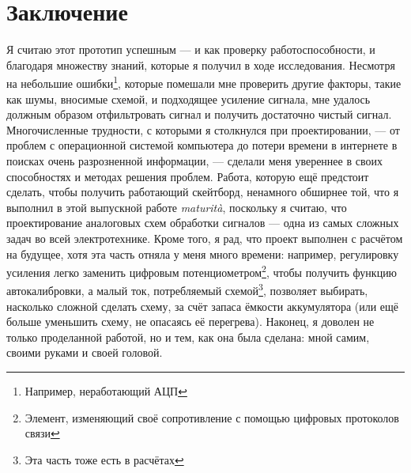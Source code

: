 \documentclass[a4paper, 10pt, final]{article} %
\begin{document}
    \section{Заключение}
    Я считаю этот прототип успешным --- и как проверку работоспособности, и благодаря множеству знаний, которые я получил в ходе исследования.
    Несмотря на небольшие ошибки\footnote{Например, неработающий АЦП}, которые помешали мне проверить другие факторы, такие как шумы, вносимые схемой, и подходящее усиление сигнала, мне удалось должным образом отфильтровать сигнал и получить достаточно чистый сигнал.
    Многочисленные трудности, с которыми я столкнулся при проектировании, --- от проблем с операционной системой компьютера до потери времени в интернете в поисках очень разрозненной информации, --- сделали меня увереннее в своих способностях и методах решения проблем.
    Работа, которую ещё предстоит сделать, чтобы получить работающий скейтборд, ненамного обширнее той, что я выполнил в этой выпускной работе \emph{maturit\`{a}}, поскольку я считаю, что проектирование аналоговых схем обработки сигналов --- одна из самых сложных задач во всей электротехнике.
    Кроме того, я рад, что проект выполнен с расчётом на будущее, хотя эта часть отняла у меня много времени: например, регулировку усиления легко заменить цифровым потенциометром\footnote{Элемент, изменяющий своё сопротивление с помощью цифровых протоколов связи}, чтобы получить функцию автокалибровки, а малый ток, потребляемый схемой\footnote{Эта часть тоже есть в расчётах}, позволяет выбирать, насколько сложной сделать схему, за счёт запаса ёмкости аккумулятора (или ещё больше уменьшить схему, не опасаясь её перегрева).
    Наконец, я доволен не только проделанной работой, но и тем, как она была сделана: мной самим, своими руками и своей головой.
\end{document}
